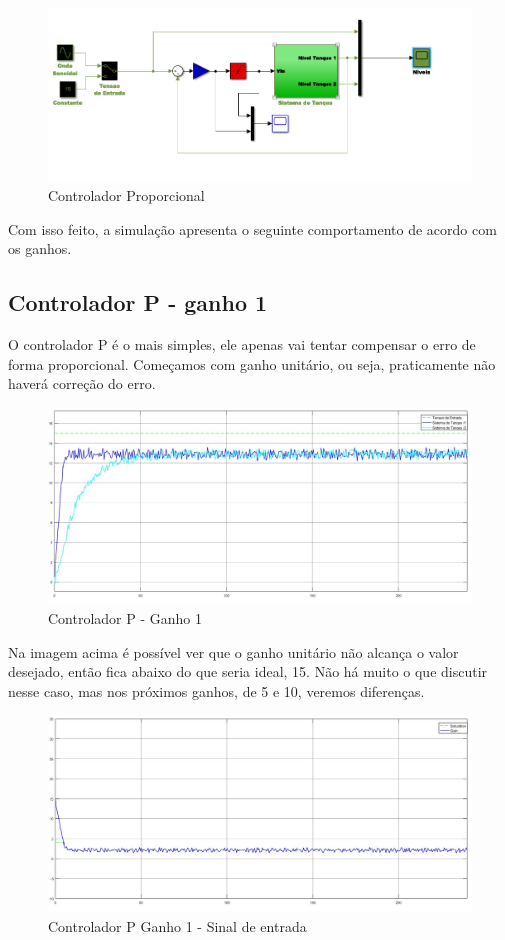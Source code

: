 \documentclass[
	12pt,				%
	openany,			%
	oneside,			%
	a4paper,			%
	english,			%
	french,				%
	spanish,			%
	brazil,				%
	]{abntex2}
\begin{document}
{\begin{figure}[h]
	\centering
	\includegraphics[scale=0.70]{controlador_p.PNG}
	\caption{Controlador Proporcional}
\end{figure}
\newpage

Com isso feito, a simulação apresenta o seguinte comportamento de acordo com os ganhos.

\subsection{Controlador P - ganho 1}

O controlador P é o mais simples, ele apenas vai tentar compensar o erro de forma proporcional. Começamos com ganho unitário, ou seja, praticamente não haverá correção do erro.

\begin{figure}[h]
	\centering
	\includegraphics[scale=0.30]{controlador_p_ganho_1.jpg}
	\caption{Controlador P - Ganho 1}
\end{figure}

Na imagem acima é possível ver que o ganho unitário não alcança o valor desejado, então fica abaixo do que seria ideal, 15. Não há muito o que discutir nesse caso, mas nos próximos ganhos, de 5 e 10, veremos diferenças.

\begin{figure}[h]
	\centering
	\includegraphics[scale=0.30]{osciloscopio_ganho_1.jpg}
	\caption{Controlador P Ganho 1 - Sinal de entrada}
\end{figure}

}
\end{document}
